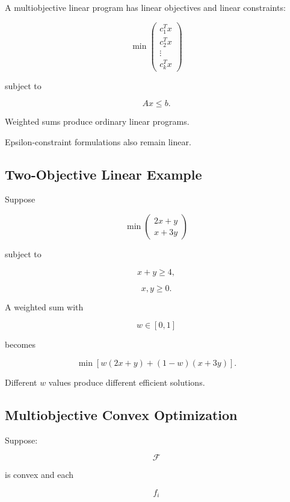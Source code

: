 A multiobjective linear program has linear objectives and linear
constraints:

\[
\boxed{
\min
\begin{pmatrix}
c_1^Tx\\
c_2^Tx\\
\vdots\\
c_k^Tx
\end{pmatrix}
}
\]

subject to

\[
\boxed{
Ax\leq b.
}
\]

Weighted sums produce ordinary linear programs.

Epsilon-constraint formulations also remain linear.

\subsection{Two-Objective Linear Example}
\label{subsec:two-objective-linear-example}

Suppose

\[
\boxed{
\min
\begin{pmatrix}
2x+y\\
x+3y
\end{pmatrix}
}
\]

subject to

\[
x+y\geq4,
\]

\[
x,y\geq0.
\]

A weighted sum with

\[
w\in[0,1]
\]

becomes

\[
\boxed{
\min
\left[
w(2x+y)
+
(1-w)(x+3y)
\right].
}
\]

Different \(w\) values produce different efficient solutions.

\subsection{Multiobjective Convex Optimization}
\label{subsec:multiobjective-convex-optimization}

Suppose:

\[
\mathcal{F}
\]

is convex and each

\[
f_i
\]

